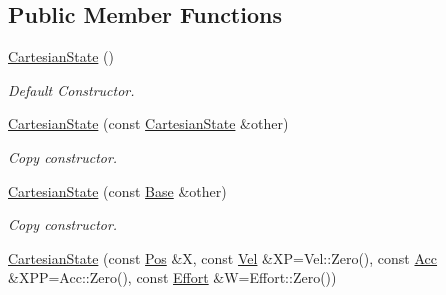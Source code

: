 \subsection*{Public Member Functions}
\begin{DoxyCompactItemize}
\item 
\hyperlink{classow__core_1_1CartesianState_ab72e1015087e08ad7a22b3342e3c0d84}{Cartesian\+State} ()\hypertarget{classow__core_1_1CartesianState_ab72e1015087e08ad7a22b3342e3c0d84}{}\label{classow__core_1_1CartesianState_ab72e1015087e08ad7a22b3342e3c0d84}

\begin{DoxyCompactList}\small\item\em Default Constructor. \end{DoxyCompactList}\item 
\hyperlink{classow__core_1_1CartesianState_ae2b25e7a201c4155de8aba2f5d52bd1f}{Cartesian\+State} (const \hyperlink{classow__core_1_1CartesianState}{Cartesian\+State} \&other)\hypertarget{classow__core_1_1CartesianState_ae2b25e7a201c4155de8aba2f5d52bd1f}{}\label{classow__core_1_1CartesianState_ae2b25e7a201c4155de8aba2f5d52bd1f}

\begin{DoxyCompactList}\small\item\em Copy constructor. \end{DoxyCompactList}\item 
\hyperlink{classow__core_1_1CartesianState_a26d23a032349c0d75dea02d0d92b64cf}{Cartesian\+State} (const \hyperlink{classow__core_1_1StateBase}{Base} \&other)\hypertarget{classow__core_1_1CartesianState_a26d23a032349c0d75dea02d0d92b64cf}{}\label{classow__core_1_1CartesianState_a26d23a032349c0d75dea02d0d92b64cf}

\begin{DoxyCompactList}\small\item\em Copy constructor. \end{DoxyCompactList}\item 
\hyperlink{classow__core_1_1CartesianState_acaf8cf11d5bed1ac921bc169ced02ad2}{Cartesian\+State} (const \hyperlink{classow__core_1_1CartesianPosition}{Pos} \&X, const \hyperlink{classow__core_1_1CartesianVelocity}{Vel} \&XP=Vel\+::\+Zero(), const \hyperlink{classow__core_1_1CartesianAcceleration}{Acc} \&X\+PP=Acc\+::\+Zero(), const \hyperlink{classow__core_1_1Wrench}{Effort} \&W=Effort\+::\+Zero())\hypertarget{classow__core_1_1CartesianState_acaf8cf11d5bed1ac921bc169ced02ad2}{}\label{classow__core_1_1CartesianState_acaf8cf11d5bed1ac921bc169ced02ad2}


\end{DoxyCompactItemize}
